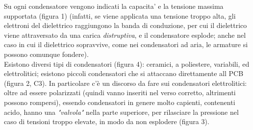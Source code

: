 \documentclass[12pt]{article}
\begin{document}
Su ogni condensatore vengono indicati la capacita' e la tensione 
massima supportata (figura 1) (infatti, se viene applicata una tensione troppo alta, gli elettroni del dielettrico raggiungono la banda di conduzione, per cui il dielettrico viene attraversato da una carica \textit{distruptiva}, e il condensatore esplode; anche nel caso in cui il dielettrico
sopravvive, come nei condensatori ad aria, le armature si possono comunque fondere). \\

Esistono diversi tipi di condensatori (figura 4): ceramici, a poliestere, variabili, ed elettrolitici; esistono piccoli condensatori che si attaccano direttamente all PCB (figura 2, C3). In particolare c'è un discorso da fare sui condensatori elettrolitici: oltre ad essere polarizzati (quindi vanno inseriti nel verso corretto, altrimenti possono rompersi), essendo condensatori in genere molto capienti, contenenti acido, hanno una \textit{"valvola"} nella parte superiore, per rilasciare la pressione nel caso di tensioni troppo elevate, in modo da non esplodere (figura 3). \\ 
\end{document}
